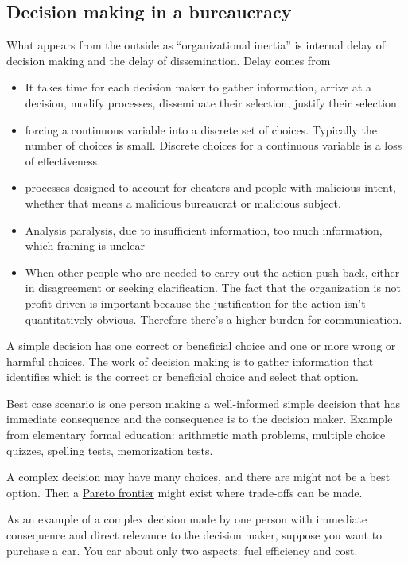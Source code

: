 \subsection{Decision making in a bureaucracy}

What appears from the outside as ``organizational inertia'' is internal delay of decision making and the delay of dissemination. 
Delay comes from
\begin{itemize}
    \item It takes time for each decision maker to gather information, arrive at a decision, modify processes, disseminate their selection, justify their selection. 
    \item forcing a continuous variable into a discrete set of choices. Typically the number of choices is small. Discrete choices for a continuous variable is a loss of effectiveness.
    \item processes designed to account for cheaters and people with malicious intent, whether that means a malicious bureaucrat or malicious subject. 
\item Analysis paralysis, due to {insufficient information, too much information, which framing is unclear}
\item When other people who are needed to carry out the action push back, either in disagreement or seeking clarification. The fact that the organization is not profit driven is important because the justification for the action isn't quantitatively obvious. Therefore there's a higher burden for communication.
\end{itemize}


A \gls{simple decision} has one correct or beneficial choice and one or more wrong or harmful choices. The work of decision making is to gather information that identifies which is the correct or beneficial choice and select that option.

Best case scenario is one person making a well-informed simple decision that has immediate consequence and the consequence is to the decision maker. Example from elementary formal education: arithmetic math problems, multiple choice quizzes, spelling tests, memorization tests. 

A complex decision may have many choices, and there are might not be a best option. Then a \href{https://en.wikipedia.org/wiki/Pareto_front}{Pareto frontier} might exist where trade-offs can be made. 

As an example of a complex decision made by one person with immediate consequence and direct relevance to the decision maker, suppose you want to purchase a car. You car about only two aspects: fuel efficiency and cost. 

